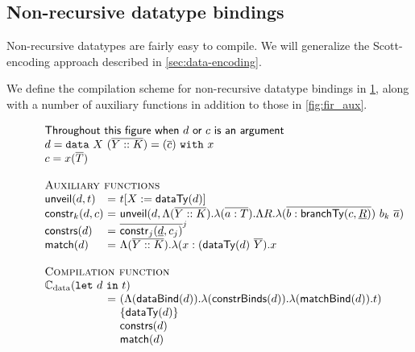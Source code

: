 \subsection{Non-recursive datatype bindings}
\label{sec:non-recursive-data}

Non-recursive datatypes are fairly easy to compile. We will generalize the
Scott-encoding approach described in \cref{sec:data-encoding}.

We define the compilation scheme for non-recursive datatype bindings in
\cref{fig:compile-datatypes}, along with a number of auxiliary functions in
addition to those in \cref{fig:fir_aux}.

\begin{figure}[!t]
  \centering
  \begin{displaymath}
  \begin{array}{l@{\ }l@{\ }l}
  \multicolumn{3}{l}{\textsf{Throughout this figure when $d$ or $c$ is an argument}}\\
  \multicolumn{3}{l}{d = \datatype{X}{(\seq{Y :: K})}{x}{(\seq{c})}} \\
  \multicolumn{3}{l}{c = x(\seq{T})}\\
  \\
  \multicolumn{3}{l}{\textsc{Auxiliary functions}}\\
  \unveil{d}{t}
  &=& \substIn{X}{\scottTy{d}}{t} \\
  \constr{d}{c}{k}
  &=& \unveil{d}{\Lambda (\seq{Y::K}) . 
  \lambda (\seq{a : T}). 
  \Lambda R . 
  \lambda (\seq{b : \branchTy{c}{\fixed{R}}}) 
  ~b_k ~ \seq{a}}\\
  \constrs{d} &=& \seq{\constr{\fixed{d}}{c_j}{j}}^j\\
  \match{d}
  &=& \Lambda (\seq{Y::K}). \lambda (x : (\scottTy{d}\ \seq{Y}) . x\\
  \\
  \multicolumn{3}{l}{\textsc{Compilation function}}\\
  \multicolumn{3}{l}{\compiledata(\tlet\, d\, \tin\, t)}\\
  &=& (\Lambda (\dataBind{d}) . \lambda (\constrBinds{d}) . \lambda (\matchBind{d}) . t)\\
  &&\{\scottTy{d}\}\ \\
  &&\constrs{d}\\
  &&\match{d}
  \end{array}
  \end{displaymath}

  \label{fig:compile-datatypes}
\end{figure}


